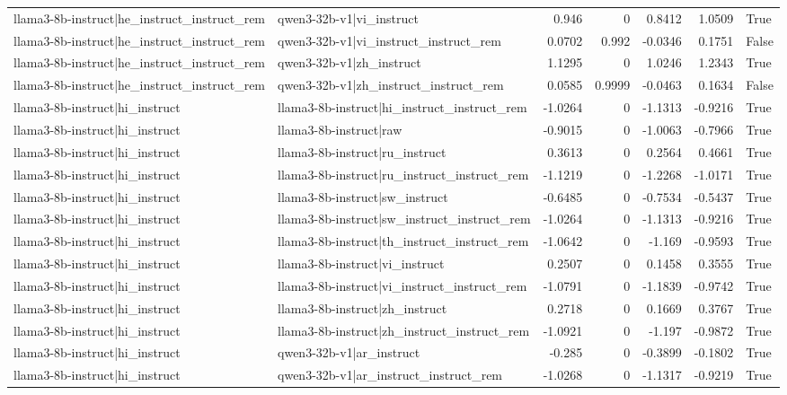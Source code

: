 \begin{table}
\begin{tabular}{l l r r r r l}
llama3-8b-instruct|he_instruct_instruct_rem & qwen3-32b-v1|vi_instruct & 0.946 & 0 & 0.8412 & 1.0509 & True \\
llama3-8b-instruct|he_instruct_instruct_rem & qwen3-32b-v1|vi_instruct_instruct_rem & 0.0702 & 0.992 & -0.0346 & 0.1751 & False \\
llama3-8b-instruct|he_instruct_instruct_rem & qwen3-32b-v1|zh_instruct & 1.1295 & 0 & 1.0246 & 1.2343 & True \\
llama3-8b-instruct|he_instruct_instruct_rem & qwen3-32b-v1|zh_instruct_instruct_rem & 0.0585 & 0.9999 & -0.0463 & 0.1634 & False \\
llama3-8b-instruct|hi_instruct & llama3-8b-instruct|hi_instruct_instruct_rem & -1.0264 & 0 & -1.1313 & -0.9216 & True \\
llama3-8b-instruct|hi_instruct & llama3-8b-instruct|raw & -0.9015 & 0 & -1.0063 & -0.7966 & True \\
llama3-8b-instruct|hi_instruct & llama3-8b-instruct|ru_instruct & 0.3613 & 0 & 0.2564 & 0.4661 & True \\
llama3-8b-instruct|hi_instruct & llama3-8b-instruct|ru_instruct_instruct_rem & -1.1219 & 0 & -1.2268 & -1.0171 & True \\
llama3-8b-instruct|hi_instruct & llama3-8b-instruct|sw_instruct & -0.6485 & 0 & -0.7534 & -0.5437 & True \\
llama3-8b-instruct|hi_instruct & llama3-8b-instruct|sw_instruct_instruct_rem & -1.0264 & 0 & -1.1313 & -0.9216 & True \\
llama3-8b-instruct|hi_instruct & llama3-8b-instruct|th_instruct_instruct_rem & -1.0642 & 0 & -1.169 & -0.9593 & True \\
llama3-8b-instruct|hi_instruct & llama3-8b-instruct|vi_instruct & 0.2507 & 0 & 0.1458 & 0.3555 & True \\
llama3-8b-instruct|hi_instruct & llama3-8b-instruct|vi_instruct_instruct_rem & -1.0791 & 0 & -1.1839 & -0.9742 & True \\
llama3-8b-instruct|hi_instruct & llama3-8b-instruct|zh_instruct & 0.2718 & 0 & 0.1669 & 0.3767 & True \\
llama3-8b-instruct|hi_instruct & llama3-8b-instruct|zh_instruct_instruct_rem & -1.0921 & 0 & -1.197 & -0.9872 & True \\
llama3-8b-instruct|hi_instruct & qwen3-32b-v1|ar_instruct & -0.285 & 0 & -0.3899 & -0.1802 & True \\
llama3-8b-instruct|hi_instruct & qwen3-32b-v1|ar_instruct_instruct_rem & -1.0268 & 0 & -1.1317 & -0.9219 & True \\

\end{tabular}
\end{table}
